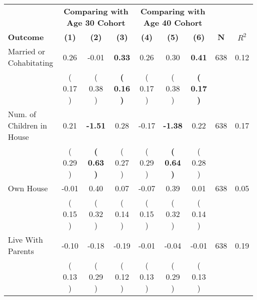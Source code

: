 \begin{tabular}{lcccccccc}
\toprule
 & \multicolumn{3}{c}{\textbf{Comparing with Age 30 Cohort}} & \multicolumn{3}{c}{\textbf{Comparing with Age 40 Cohort}} & \\
\cmidrule(lr){2-4} \cmidrule(lr){5-7} 
 \textbf{Outcome} & \textbf{(1)} & \textbf{(2)} & \textbf{(3)} & \textbf{(4)} & \textbf{(5)} & \textbf{(6)} & \textbf{N} & \textbf{$ R^2$} \\
\midrule
Married or Cohabitating &      0.26 &     -0.01 & \textbf{     0.33} &      0.26 &      0.30 & \textbf{     0.41} & 638 &       0.12 \\ 
 & (     0.17 ) & (     0.38 ) & \textbf{(     0.16 )} & (     0.17 ) & (     0.38 ) & \textbf{(     0.17 )} & \\
Num. of Children in House &      0.21 & \textbf{    -1.51} &      0.28 &     -0.17 & \textbf{    -1.38} &      0.22 & 638 &       0.17 \\ 
 & (     0.29 ) & \textbf{(     0.63 )} & (     0.27 ) & (     0.29 ) & \textbf{(     0.64 )} & (     0.28 ) & \\
Own House &     -0.01 &      0.40 &      0.07 &     -0.07 &      0.39 &      0.01 & 638 &       0.05 \\ 
 & (     0.15 ) & (     0.32 ) & (     0.14 ) & (     0.15 ) & (     0.32 ) & (     0.14 ) & \\
Live With Parents &     -0.10 &     -0.18 &     -0.19 &     -0.01 &     -0.04 &     -0.01 & 638 &       0.19 \\ 
 & (     0.13 ) & (     0.29 ) & (     0.12 ) & (     0.13 ) & (     0.29 ) & (     0.13 ) & \\
\bottomrule
\end{tabular}
